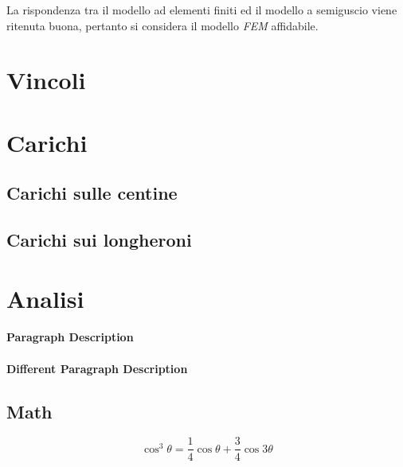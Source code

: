 \documentclass[
10pt, %
a4paper, %
oneside, %
headinclude,footinclude, %
BCOR5mm, %
]{scrartcl}
\begin{document}
La rispondenza tra il modello ad elementi finiti ed il modello a semiguscio viene ritenuta buona, pertanto si considera il modello \emph{FEM} affidabile.

\newpage


\section{Vincoli}
\label{sec:vincoli}




\section{Carichi}

\subsection{Carichi sulle centine}


\subsection{Carichi sui longheroni}



\section{Analisi}

\newpage


\paragraph{Paragraph Description} \lipsum[7] %

\paragraph{Different Paragraph Description} \lipsum[8] %


\subsection{Math}

\lipsum[4] %

\begin{equation}
\cos^3 \theta =\frac{1}{4}\cos\theta+\frac{3}{4}\cos 3\theta
\label{eq:refname2}
\end{equation}
\end{document}
